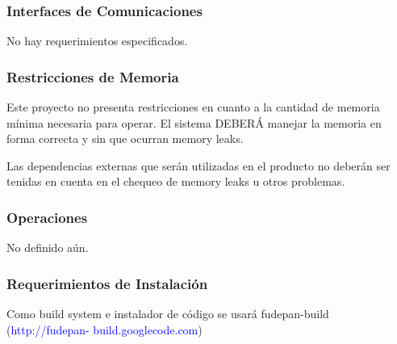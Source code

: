 \documentclass[10pt,a4paper,english,spanish]{article}
\begin{document}
	\subsubsection{Interfaces de Comunicaciones}
		No hay requerimientos especificados.

	\subsubsection{Restricciones de Memoria}	
		\par Este proyecto no presenta restricciones en cuanto a la cantidad de memoria mínima necesaria para operar. El 			sistema DEBERÁ manejar la memoria en forma correcta y sin que ocurran memory leaks.
		\par Las dependencias externas que serán utilizadas en el producto no deberán ser tenidas en cuenta en el chequeo 
		de memory leaks u otros problemas.
		
	\subsubsection{Operaciones}
		No definido aún.		

	\subsubsection{Requerimientos de Instalación}
		Como build system e instalador de código se usará fudepan-build (\textcolor{blue}{http://fudepan-	build.googlecode.com}) 
\end{document}
